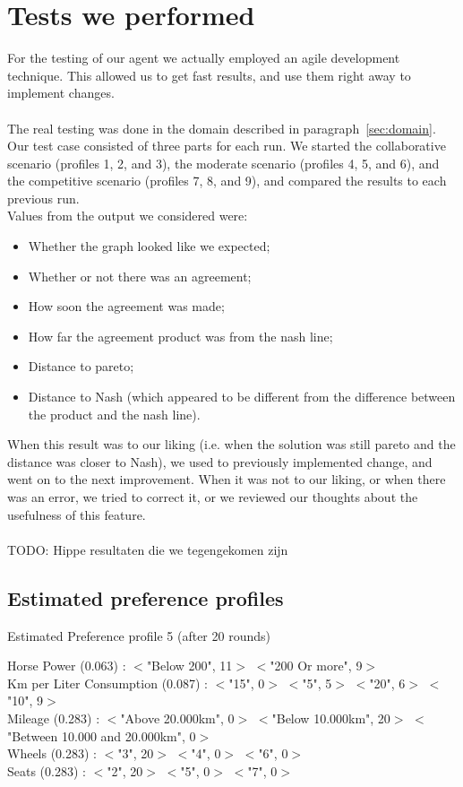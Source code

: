 \section{Tests we performed}
For the testing of our agent we actually employed an agile development technique. This allowed us to get fast results, and use them right away to implement changes.
\\\\
The real testing was done in the domain described in paragraph~\ref{sec:domain}. Our test case consisted of three parts for each run. We started the collaborative scenario (profiles 1, 2, and 3), the moderate scenario (profiles 4, 5, and 6), and the competitive scenario (profiles 7, 8, and 9), and compared the results to each previous run.
\\
Values from the output we considered were:
\begin{itemize}
\item Whether the graph looked like we expected;
\item Whether or not there was an agreement;
\item How soon the agreement was made;
\item How far the agreement product was from the nash line;
\item Distance to pareto;
\item Distance to Nash (which appeared to be different from the difference between the product and the nash line).
\end{itemize}

When this result was to our liking (i.e. when the solution was still pareto and the distance was closer to Nash), we used to previously implemented change, and went on to the next improvement. When it was not to our liking, or when there was an error, we tried to correct it, or we reviewed our thoughts about the usefulness of this feature.
\\\\
TODO: Hippe resultaten die we tegengekomen zijn

\subsection{Estimated preference profiles}


\begin{table}[H]
\centering
\caption{Estimated Preference profile 5 (after 20 rounds)}
\label{tab:estprefprof5}
Horse Power (0.063) : $<$"Below 200", 11$>$ $<$"200 Or more", 9$>$ 
\\
Km per Liter Consumption (0.087) : $<$"15", 0$>$ $<$"5", 5$>$ $<$"20", 6$>$ $<$"10", 9$>$ 
\\
Mileage (0.283) : $<$"Above 20.000km", 0$>$ $<$"Below 10.000km", 20$>$ $<$"Between 10.000 and 20.000km", 0$>$ 
\\
Wheels (0.283) : $<$"3", 20$>$ $<$"4", 0$>$ $<$"6", 0$>$ 
\\
Seats (0.283) : $<$"2", 20$>$ $<$"5", 0$>$ $<$"7", 0$>$ 
\end{table}

